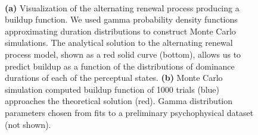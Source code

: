 \documentclass{frontiersSCNS} %
\begin{document}
\begin{figure}	
	\centering
	
	   \\
	  \vspace{20 pt}
   
	\caption{\textbf{(a)} Visualization of the alternating renewal process producing a buildup function. We used gamma probability density functions approximating duration distributions to construct Monte Carlo simulations. The analytical solution to the alternating renewal process model, shown as a red solid curve (bottom), allows us to predict buildup as a function of the distributions of dominance durations of each of the perceptual states. \textbf{(b)} Monte Carlo simulation computed buildup function of 1000 trials (blue) approaches the theoretical solution (red). Gamma distribution parameters chosen from fits to a preliminary psychophysical dataset (not shown).}
	\label{fig:makingBUFs}
\end{figure}
\end{document}
